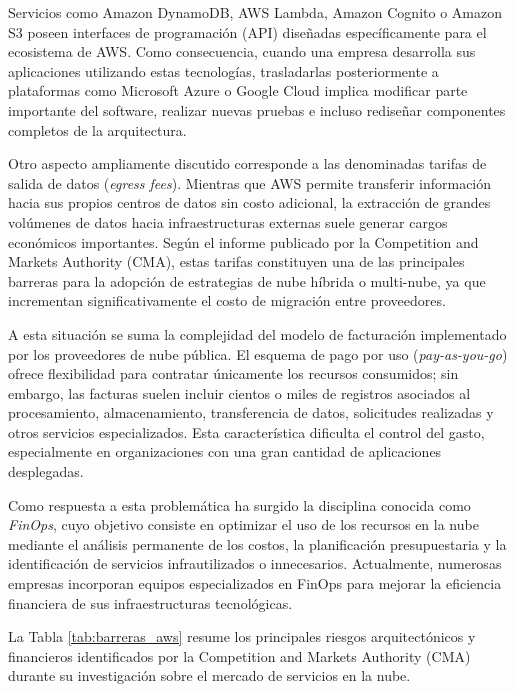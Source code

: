 \documentclass[12pt,a4paper]{article}
\begin{document}
Servicios como Amazon DynamoDB, AWS Lambda, Amazon Cognito o Amazon S3 poseen interfaces de programación (API) diseñadas específicamente para el ecosistema de AWS. Como consecuencia, cuando una empresa desarrolla sus aplicaciones utilizando estas tecnologías, trasladarlas posteriormente a plataformas como Microsoft Azure o Google Cloud implica modificar parte importante del software, realizar nuevas pruebas e incluso rediseñar componentes completos de la arquitectura.\parencite{cma2025}

Otro aspecto ampliamente discutido corresponde a las denominadas tarifas de salida de datos (\textit{egress fees}). Mientras que AWS permite transferir información hacia sus propios centros de datos sin costo adicional, la extracción de grandes volúmenes de datos hacia infraestructuras externas suele generar cargos económicos importantes. Según el informe publicado por la Competition and Markets Authority (CMA), estas tarifas constituyen una de las principales barreras para la adopción de estrategias de nube híbrida o multi-nube, ya que incrementan significativamente el costo de migración entre proveedores.\parencite{cma2025}

A esta situación se suma la complejidad del modelo de facturación implementado por los proveedores de nube pública. El esquema de pago por uso (\textit{pay-as-you-go}) ofrece flexibilidad para contratar únicamente los recursos consumidos; sin embargo, las facturas suelen incluir cientos o miles de registros asociados al procesamiento, almacenamiento, transferencia de datos, solicitudes realizadas y otros servicios especializados. Esta característica dificulta el control del gasto, especialmente en organizaciones con una gran cantidad de aplicaciones desplegadas.

Como respuesta a esta problemática ha surgido la disciplina conocida como \textit{FinOps}, cuyo objetivo consiste en optimizar el uso de los recursos en la nube mediante el análisis permanente de los costos, la planificación presupuestaria y la identificación de servicios infrautilizados o innecesarios. Actualmente, numerosas empresas incorporan equipos especializados en FinOps para mejorar la eficiencia financiera de sus infraestructuras tecnológicas.

La Tabla \ref{tab:barreras_aws} resume los principales riesgos arquitectónicos y financieros identificados por la Competition and Markets Authority (CMA) durante su investigación sobre el mercado de servicios en la nube.
\end{document}
